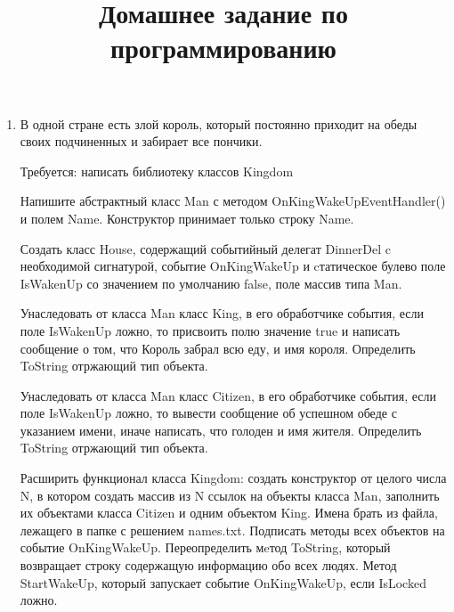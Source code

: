 \documentclass[a4paper,12pt]{article} %
\author{}
\title{Домашнее задание по программированию}
\date{}
\begin{document}
	\maketitle
	
	\begin{enumerate}
		\item \noindent В одной стране есть злой король, который постоянно приходит на обеды своих подчиненных и забирает все пончики.
		
		Требуется: написать библиотеку классов Kingdom
		
		Напишите абстрактный класс Man с методом OnKingWakeUpEventHandler() и полем Name. Конструктор принимает только строку Name.
		
		Создать класс House, содержащий событийный делегат DinnerDel c необходимой сигнатурой, событие OnKingWakeUp и cтатическое булево поле IsWakenUp со значением по умолчанию false, поле массив типа Man.
		
		Унаследовать от класса Man класс King, в его обработчике события, если поле IsWakenUp ложно, то присвоить полю значение true и написать сообщение о том, что Король забрал всю еду, и имя короля. Определить ToString отржающий тип объекта. 
	
	Унаследовать от класса Man класс Citizen, в его обработчике события, если поле IsWakenUp ложно, то вывести сообщение об успешном обеде с указанием имени, иначе написать, что голоден и имя жителя. Определить ToString отржающий тип объекта.
	
	Расширить функционал класса Kingdom: создать конструктор от целого числа N, в котором создать массив из N ссылок на объекты класса Man, заполнить их объектами класса Citizen и одним объектом King. Имена брать из файла, лежащего в папке с решением names.txt. Подписать методы всех объектов на событие OnKingWakeUp. Переопределить мeтод ToString, который возвращает строку содержащую информацию обо всех людях. Метод StartWakeUp, который запускает событие OnKingWakeUp, если IsLocked ложно.
	
	\end{enumerate}
	
\end{document}
